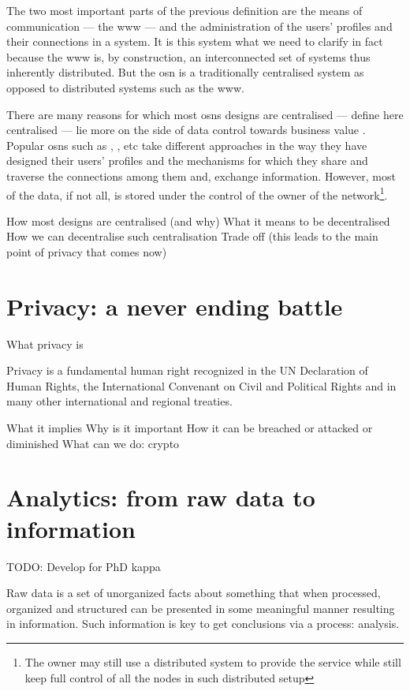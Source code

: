 \documentclass[showtrims]{kthesis}
\begin{document}
The two most important parts of the previous definition are the means of communication 
--- the \ac{www} --- and the administration of the users' profiles and their connections 
in a system. It is this system what we need to clarify in fact because the \ac{www} 
is, by construction, an interconnected set of systems thus inherently distributed. 
But the \ac{osn} is a traditionally centralised system as opposed to distributed 
systems such as the \ac{www}.

There are many reasons for which most \acp{osn} designs are centralised --- define here centralised --- 
lie more on the side of data control towards business value \cite{look-for-reference}.
Popular \acp{osn} such as \Facebook, \Twitter, etc take different approaches in the 
way they have designed their users' profiles and the mechanisms for which they share 
and traverse the connections among them and, exchange information. However, most 
of the data, if not all, is stored under the control of the owner of the network\footnote{The 
owner may still use a distributed system to provide the service while still keep 
full control of all the nodes in such distributed setup}.



How most designs are centralised (and why)
What it means to be decentralised
How we can decentralise such centralisation
Trade off (this leads to the main point of privacy that comes now)

\section{Privacy: a never ending battle}

What privacy is

Privacy is a fundamental human right recognized in the UN Declaration of Human Rights, 
the International Convenant on Civil and Political Rights and in many other international 
and regional treaties.

What it implies
Why is it important
How it can be breached or attacked or diminished
What can we do: crypto

\section{Analytics: from raw data to information}
TODO: Develop for PhD kappa

Raw data is a set of unorganized facts about something that when processed, organized 
and structured can be presented in some meaningful manner resulting in information.
Such information is key to get conclusions via a process: analysis.
\end{document}
